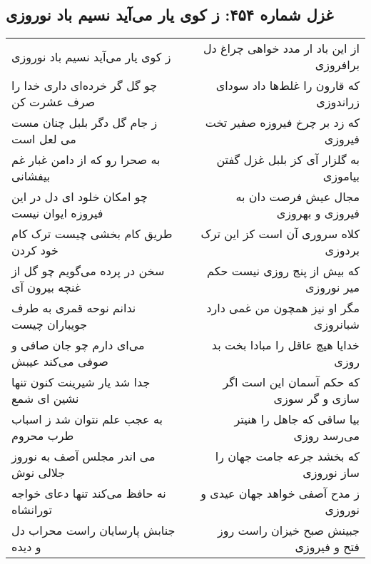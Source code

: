 \begin{center}
\section*{غزل شماره ۴۵۴: ز کوی یار می‌آید نسیم باد نوروزی}
\label{sec:sh454}
\begin{longtable}{l p{0.5cm} r}
ز کوی یار می‌آید نسیم باد نوروزی
&&
از این باد ار مدد خواهی چراغ دل برافروزی
\\
چو گل گر خرده‌ای داری خدا را صرف عشرت کن
&&
که قارون را غلط‌ها داد سودای زراندوزی
\\
ز جام گل دگر بلبل چنان مست می لعل است
&&
که زد بر چرخ فیروزه صفیر تخت فیروزی
\\
به صحرا رو که از دامن غبار غم بیفشانی
&&
به گلزار آی کز بلبل غزل گفتن بیاموزی
\\
چو امکان خلود ای دل در این فیروزه ایوان نیست
&&
مجال عیش فرصت دان به فیروزی و بهروزی
\\
طریق کام بخشی چیست ترک کام خود کردن
&&
کلاه سروری آن است کز این ترک بردوزی
\\
سخن در پرده می‌گویم چو گل از غنچه بیرون آی
&&
که بیش از پنج روزی نیست حکم میر نوروزی
\\
ندانم نوحه قمری به طرف جویباران چیست
&&
مگر او نیز همچون من غمی دارد شبانروزی
\\
می‌ای دارم چو جان صافی و صوفی می‌کند عیبش
&&
خدایا هیچ عاقل را مبادا بخت بد روزی
\\
جدا شد یار شیرینت کنون تنها نشین ای شمع
&&
که حکم آسمان این است اگر سازی و گر سوزی
\\
به عجب علم نتوان شد ز اسباب طرب محروم
&&
بیا ساقی که جاهل را هنیتر می‌رسد روزی
\\
می اندر مجلس آصف به نوروز جلالی نوش
&&
که بخشد جرعه جامت جهان را ساز نوروزی
\\
نه حافظ می‌کند تنها دعای خواجه تورانشاه
&&
ز مدح آصفی خواهد جهان عیدی و نوروزی
\\
جنابش پارسایان راست محراب دل و دیده
&&
جبینش صبح خیزان راست روز فتح و فیروزی
\\
\end{longtable}
\end{center}
